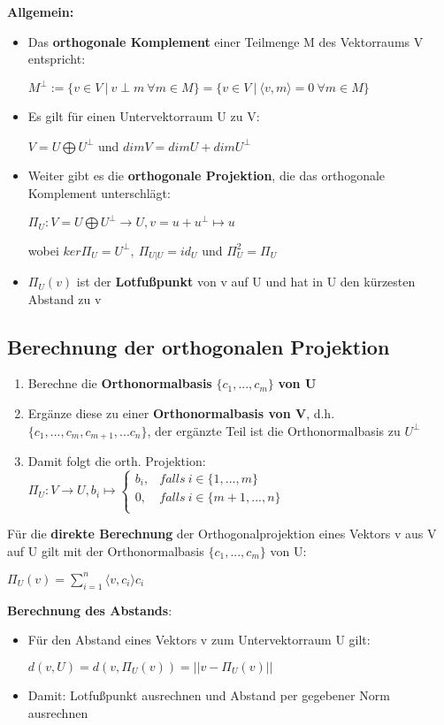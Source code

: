 \textbf{Allgemein:}
\begin{itemize}
	\item Das \textbf{orthogonale Komplement} einer Teilmenge M des Vektorraums V entspricht:
	\begin{center}
		$M^\perp := \{v \in V\ |\ v\perp m\ \forall m\in M\} = \{v\in V\ |\ \langle v, m\rangle = 0\ \forall m\in M\}$
	\end{center}
	\item Es gilt für einen Untervektorraum U zu V:
	\begin{center}
		$V = U \bigoplus U^\perp$ und $dim V = dim U + dim U^\perp$
	\end{center}
	\item Weiter gibt es die \textbf{orthogonale Projektion}, die das orthogonale Komplement unterschlägt:
	\begin{center}
		$\Pi_U: V = U \bigoplus U^\perp \rightarrow U, v = u + u^\perp \mapsto u$
	\end{center}
	wobei $ker \Pi_U = U^\perp,\ \Pi_{U|U} = id_U$ und $\Pi^2_U = \Pi_U$
	\item $\Pi_U(v)$ ist der \textbf{Lotfußpunkt} von v auf U und hat in U den kürzesten Abstand zu v
\end{itemize}

\newpage
\subsection{Berechnung der orthogonalen Projektion}%
\label{os:sub:berechnung_der_orthogonalen_projektion}	
\begin{enumerate}
	\item Berechne die \textbf{Orthonormalbasis} $\{c_1, ..., c_m\}$ \textbf{von U}
	\item Ergänze diese zu einer \textbf{Orthonormalbasis von V}, d.h. $\{c_1, ..., c_m, c_{m + 1}, ... c_n\}$, der ergänzte Teil ist die Orthonormalbasis zu $U^\perp$
	\item Damit folgt die orth. Projektion: $\Pi_U: V \rightarrow U, b_i \mapsto
	\begin{cases}
		b_i,& falls\ i \in \{1, ..., m\}\\
		0,& falls\ i \in \{m + 1, ..., n\}\\
	\end{cases}$
\end{enumerate}
Für die \textbf{direkte Berechnung} der Orthogonalprojektion eines Vektors v aus V auf U gilt mit der Orthonormalbasis $\{c_1, ..., c_m\}$ von U:
\begin{center}
	$\Pi_U(v) = \sum_{i = 1}^{n} \langle v, c_i \rangle c_i$
\end{center}
\textbf{Berechnung des Abstands}:
\begin{itemize}
	\item Für den Abstand eines Vektors v zum Untervektorraum U gilt:
	\begin{center}
		$d(v, U) = d(v, \Pi_U(v)) = ||v - \Pi_U(v)||$
	\end{center}
	\item Damit: Lotfußpunkt ausrechnen und Abstand per gegebener Norm ausrechnen
\end{itemize}


